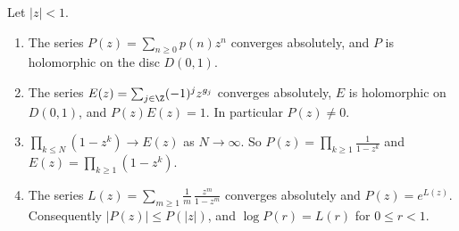 \begin{lemma}\label{lem:pdisc}
Let $|z|<1$.
\begin{enumerate}[label=(\alph*)]
\item The series $P(z)=\sum_{n\ge0}p(n)z^n$ converges absolutely, and $P$ is holomorphic on the disc $D(0,1)$.
\item The series $E(z)=\sum_{j\in\Z}(-1)^jz^{g_j}$ converges absolutely, $E$ is holomorphic on $D(0,1)$, and $P(z)E(z)=1$. In particular $P(z)\ne0$.
\item $\prod_{k\le N}(1-z^k)\to E(z)$ as $N\to\infty$. So $P(z)=\prod_{k\ge1}\frac1{1-z^k}$ and $E(z)=\prod_{k\ge1}(1-z^k)$.
\item The series $L(z)=\sum_{m\ge1}\frac1m\,\frac{z^m}{1-z^m}$ converges absolutely and $P(z)=e^{L(z)}$. Consequently $|P(z)|\le P(|z|)$, and $\log P(r)=L(r)$ for $0\le r<1$.
\end{enumerate}
\end{lemma}
